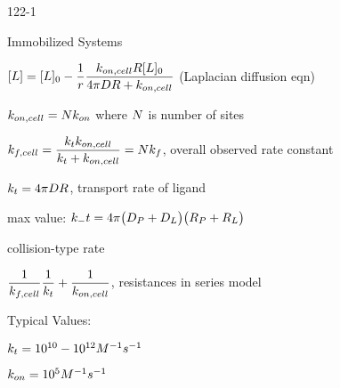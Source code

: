 \begin{mitframe}{122-1}
 \item Immobilized Systems
 	\begin{listtwo}
    	\item $[\length]=[\length]_{\init}-\dfrac{1}{\pos}\dfrac{\thermcond_{on,cell}\gasconst[\length]_{\init}}{4\pi\elecdisplace\gasconst+\thermcond_{on,cell}}$ (Laplacian diffusion eqn)
        \begin{listthree}
        	\item $\thermcond_{on,cell}=\nummoles\thermcond_{on}$ where $\nummoles$ is number of sites
            \item $\thermcond_{f,cell}=\dfrac{\thermcond_{\timet}\thermcond_{on,cell}}{\thermcond_{\timet}+\thermcond_{on,cell}}=\nummoles\thermcond_{\fug}$, overall observed rate constant
            \begin{listfour}
            	\item $\thermcond_{\timet}=4\pi\elecdisplace\gasconst$, transport rate of ligand
                \item max value: $\thermcond_-{\timet}=4\pi\big(\elecdisplace_{\p}+\elecdisplace_{\length}\big)\big(\gasconst_{\p}+\gasconst_{\length}\big)$
                \begin{listfive}
                	\item collision-type rate
                  \end{listfive}
            \end{listfour}
        	\item $\dfrac{1}{\thermcond_{f,cell}}\dfrac{1}{\thermcond_{\timet}}+\dfrac{1}{\thermcond_{on,cell}}$, resistances in series model
            \item Typical Values:
            \begin{listfour}
            	\item $\thermcond_{\timet}=10^{10}-10^{12}M^{-1}s^{-1}$
                \item $\thermcond_{on}=10^5M^{-1}s^{-1}$
            \end{listfour}
        \end{listthree}
    \end{listtwo}
\end{mitframe}